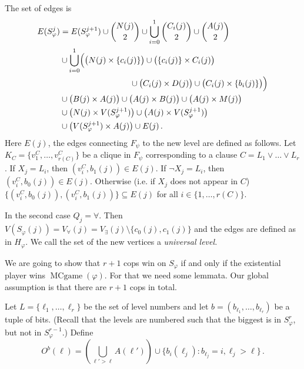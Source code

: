 \documentclass[authoryear]{article}
\makeatletter
\theoremstyle{definition}
\renewcommand{\mid}{\ensuremath{:}}
\renewcommand{\phi}{\varphi}
\newcommand{\0}{\emptyset}
\DeclareMathOperator{\MCGAME}{MCgame}
\newcommand{\ie}{i.e.\@\xspace}
\makeatother
\begin{document}
The set of edges is
\begin{align*}
                    E(S_\phi^j) & = E(S_\phi^{j+1}) \cup {N(j) \choose 2} \cup 
\bigcup_{i=0}^{1}
{C_i(j) \choose 2} \cup {A(j) \choose 2}\\
                     &\cup \bigcup_{i=0}^1 \Bigl( \bigl(N(j) \times  
\{c_i(j)\}\bigr) \cup
                     \bigl(\{c_i(j)\} \times C_i(j)\bigr)\\
                     & \hspace{3cm}\cup \bigl(C_i(j) \times D(j)
                     \bigr) \cup \bigl(C_i(j) \times
                     \{b_i(j)\}\bigr) \Bigr) \\
                    & \cup
                     \bigl(B(j) \times A(j)\bigr) \cup
                     \bigl(A(j) \times B(j) \bigr)\cup \bigl(A(j) \times 
M(j)\bigr)\\
                    & \cup \bigl(N(j) \times V(S_\phi^{j+1})\bigr) \cup 
\bigl(A(j)
                     \times V(S_\phi^{j+1})\bigr)\\
                    & \cup \bigl( V(S_\phi^{j+1})
                     \times A(j) \bigr) \cup E(j)\,.
\end{align*}
Here $E(j)$, the edges connecting $F_\psi$ to the new level are
defined as follows. Let $K_C = \{v_1^C,\ldots,v_{r(C)}^C\}$ be a
clique in $F_\psi$ corresponding to a clause $C = L_1\lor{}\ldots
{}\lor L_r$. If $X_j = L_i$, then $(v_i^C,b_1(j))\in E(j)$. If $\neg X_j =
L_i$, then $(v_i^C,b_0(j))\in E(j)$. Otherwise (\ie if $X_j$ does not
appear in $C$) $\{(v_i^C,b_0(j)),(v_i^C,b_1(j))\}\subseteq E(j)$ for all $i\in\{1,\ldots,r(C)\}$.

In the second case $Q_j = \forall$. Then $V(S_\phi(j)) = V_\forall(j) = 
V_\exists(j) \setminus \{c_0(j),c_1(j)\}$ and the edges are defined as in 
$H_\phi$. We call the set of the new vertices a \emph{universal level.} 

We are going to show that $r+1$ cops win on $S_\phi$ if and only if the 
existential player wins $\MCGAME(\phi)$. For that we need some 
lemmata. Our global assumption is that there are $r+1$ cops in total.

Let $L = \{\ell_1,\ldots,\ell_r\}$ be the
set of level numbers and let $b = (b_{\ell_1},\ldots, b_{\ell_r})$ be a tuple of
bits. (Recall that the levels are numbered such that the biggest is in
$S^r_\phi$, but not in $S^{r-1}_\phi$.) Define
\[O^b(\ell) = \left( \bigcup_{\ell'>\ell} A(\ell')\right)\cup \{b_i(\ell_j) \mid
b_{\ell_j} = i, \ell_j>\ell\}\,.\]
\end{document}
